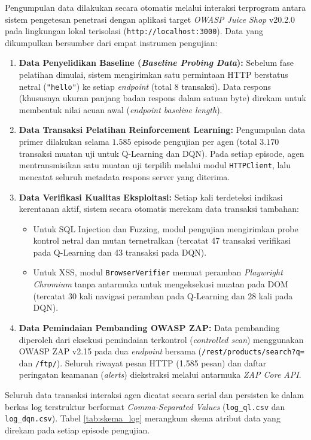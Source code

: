 Pengumpulan data dilakukan secara otomatis melalui interaksi terprogram antara sistem pengetesan penetrasi dengan aplikasi target \textit{OWASP Juice Shop} v20.2.0 pada lingkungan lokal terisolasi (\texttt{http://localhost:3000}). Data yang dikumpulkan bersumber dari empat instrumen pengujian:
\begin{enumerate}
    \item \textbf{Data Penyelidikan Baseline (\textit{Baseline Probing Data}):} Sebelum fase pelatihan dimulai, sistem mengirimkan satu permintaan HTTP berstatus netral (\texttt{"hello"}) ke setiap \textit{endpoint} (total 8 transaksi). Data respons (khususnya ukuran panjang badan respons dalam satuan byte) direkam untuk membentuk nilai acuan awal (\textit{endpoint baseline length}).
    \item \textbf{Data Transaksi Pelatihan Reinforcement Learning:} Pengumpulan data primer dilakukan selama $1.585$ episode pengujian per agen (total $3.170$ transaksi muatan uji untuk Q-Learning dan DQN). Pada setiap episode, agen mentransmisikan satu muatan uji terpilih melalui modul \texttt{HTTPClient}, lalu mencatat seluruh metadata respons server yang diterima.
    \item \textbf{Data Verifikasi Kualitas Eksploitasi:} Setiap kali terdeteksi indikasi kerentanan aktif, sistem secara otomatis merekam data transaksi tambahan:
    \begin{itemize}
        \item Untuk SQL Injection dan Fuzzing, modul pengujian mengirimkan probe kontrol netral dan mutan ternetralkan (tercatat 47 transaksi verifikasi pada Q-Learning dan 43 transaksi pada DQN). 
        \item Untuk XSS, modul \texttt{BrowserVerifier} memuat peramban \textit{Playwright Chromium} tanpa antarmuka untuk mengeksekusi muatan pada DOM (tercatat 30 kali navigasi peramban pada Q-Learning dan 28 kali pada DQN). 
    \end{itemize}
    \item \textbf{Data Pemindaian Pembanding OWASP ZAP:} Data pembanding diperoleh dari eksekusi pemindaian terkontrol (\textit{controlled scan}) menggunakan OWASP ZAP v2.15 pada dua \textit{endpoint} bersama (\texttt{/rest/products/search?q=} dan \texttt{/ftp/}). Seluruh riwayat pesan HTTP (1.585 pesan) dan daftar peringatan keamanan (\textit{alerts}) diekstraksi melalui antarmuka \textit{ZAP Core API}.
\end{enumerate}

Seluruh data transaksi interaksi agen dicatat secara serial dan persisten ke dalam berkas log terstruktur berformat \textit{Comma-Separated Values} (\texttt{log\_ql.csv} dan \texttt{log\_dqn.csv}). Tabel \ref{tab:skema_log} merangkum skema atribut data yang direkam pada setiap episode pengujian.

